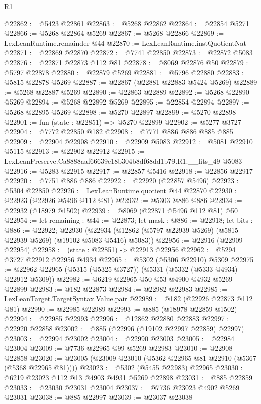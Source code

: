 \begin{lexlean}{R1}
\begin{coremodule}
@22862 := @5423 @22861
@22863 := @5268 @22862
@22864 := @22854 @5271
@22866 := @5268 @22864 @5269
@22867 := @5268 @22866
@22869 := LexLeanRuntime.remainder @44
@22870 := LexLeanRuntime.instQuotientNat
@22871 := @22869 @22870
@22872 := @7741 @22850
@22873 := @22872 @5083
@22876 := @22871 @22873 @112 @81
@22878 := @8069 @22876 @50
@22879 := @5797 @22878
@22880 := @22879 @5269
@22881 := @5796 @22880
@22883 := @5815 @22878 @5269
@22887 := @22867 (@22881 @22883 @5424 @5269)
@22889 := @5268 @22887 @5269
@22890 := @22863 @22889
@22892 := @5268 @22890 @5269
@22894 := @5268 @22892 @5269
@22895 := @22854 @22894
@22897 := @5268 @22895 @5269
@22898 := @5270 @22897
@22899 := @5270 @22898
@22901 := fun (state : @22851) => @5270 @22899
@22902 := @5277 @3727
@22904 := @7772 @22850 @182
@22908 := @7771 @886 @886 @885 @885
@22909 := @22904 @22908
@22910 := @22909 @5083
@22912 := @5081 @22910 @5115
@22913 := @22902 @22912
@22915 := LexLeanPreserve.Ca8888aaf66639e18b304b8df68dd1b79.R1.__fits_49 @5083
@22916 := @5283 @22915
@22917 := @22857 @5416
@22918 := @22856 @22917
@22920 := @7751 @886 @886
@22922 := @22920 (@22857 @5496)
@22923 := @5304 @22850
@22926 := LexLeanRuntime.quotient @44 @22870
@22930 := @22923 (@22926 @5496 @112 @81)
@22932 := @5303 @886 @886
@22934 := @22932 (@18979 @1502)
@22939 := @8069 (@22871 @5496 @112 @81) @50
@22954 := let remaining : @44 := @22873;
  let mask : @886 := @22918;
  let bits : @886 := @22922;
  @22930 (@22934 (@12862 (@5797 @22939 @5269) (@5815 @22939 @5269) (@19102 @5083 @5416) @5083))
@22956 := @22916 (@22909 @22954)
@22958 := (state : @22851) -> @22913 @22956
@22962 := @5294 @3727 @22912 @22956 @4934
@22965 := @5302 (@5306 @22910) @5309
@22975 := @22962 @22965 (@5315 (@5325 @3727)) (@5331 (@5332 (@5333 @4934) @22912 @5309))
@22982 := @6219 @22965 @50 @53 @4900 @4932 @5269 @22899
@22983 := @182 @22873
@22984 := @22982 @22983
@22985 := LexLeanTarget.TargetSyntax.Value.pair
@22989 := @182 (@22926 @22873 @112 @81)
@22990 := @22985 @22989
@22993 := @885 (@18978 @22859 @1502)
@22994 := @22985 @22993
@22996 := @12862 @22880 @22883
@22997 := @22920 @22858
@23002 := @885 (@22996 (@19102 @22997 @22859) @22997)
@23003 := @22994 @23002
@23004 := @22990 @23003
@23005 := @22984 @23004
@23009 := @7736 @22965 @99 @5269 @22983
@23010 := @22908 @22858
@23020 := @23005 (@23009 @23010 (@5362 @22965 @81 @22910 (@5367 (@5368 @22965 @81))))
@23023 := @5302 (@5455 @22983) @22965
@23030 := @6219 @23023 @112 @13 @4903 @4931 @5269 @22898
@23031 := @885 @22859
@23033 := @23030 @23031 @23004
@23037 := @7736 @23023 @4902 @5269 @23031
@23038 := @885 @22997
@23039 := @23037 @23038

\end{coremodule}
\end{lexlean}

